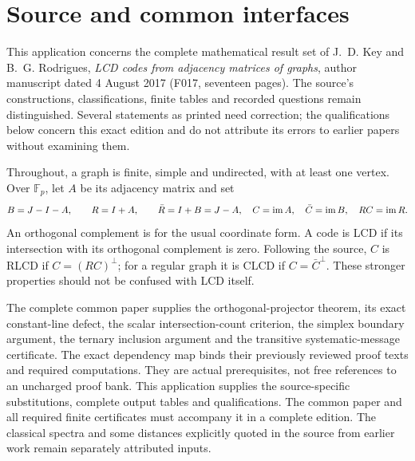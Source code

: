 \section{Source and common interfaces}
This application concerns the complete mathematical result set of
J.~D. Key and B.~G. Rodrigues, \emph{LCD codes from adjacency matrices of
graphs}, author manuscript dated 4 August 2017 (F017, seventeen pages).
The source's constructions, classifications, finite tables and recorded
questions remain distinguished. Several statements as printed need
correction; the qualifications below concern this exact edition and do
not attribute its errors to earlier papers without examining them.

Throughout, a graph is finite, simple and undirected, with at least one
vertex. Over $\mathbb F_p$, let $A$ be its adjacency matrix and set
\[
 B=J-I-A,\qquad R=I+A,\qquad \bar R=I+B=J-A,
 \quad C=\operatorname{im} A,\quad\bar C=\operatorname{im} B,\quad RC=\operatorname{im} R.
\]
An orthogonal complement is for the usual coordinate form. A code is
LCD if its intersection with its orthogonal complement is zero.
Following the source, $C$ is RLCD if $C=(RC)^\perp$; for a regular graph
it is CLCD if $C=\bar C^\perp$. These stronger properties should not be
confused with LCD itself.

The complete common paper supplies the orthogonal-projector theorem,
its exact constant-line defect, the scalar intersection-count criterion,
the simplex boundary argument, the ternary inclusion argument and the
transitive systematic-message certificate. The exact dependency map
binds their previously reviewed proof texts and required computations.
They are actual prerequisites, not free references to an uncharged proof
bank. This application supplies the source-specific substitutions,
complete output tables and qualifications. The common paper and all
required finite certificates must accompany it in a complete edition.
The classical spectra and some distances explicitly quoted in the
source from earlier work remain separately attributed inputs.
